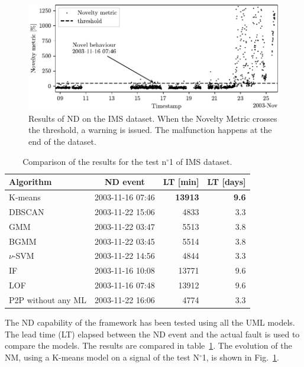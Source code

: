 \begin{figure}
    \includegraphics[width=\linewidth]{images/ND_IMS.pdf}
    \caption{Results of ND on the IMS dataset. When the Novelty Metric crosses the threshold, a warning is issued. The malfunction happens at the end of the dataset.}
    \label{fig:ND_IMS}
\end{figure}
\begin{table}
    \centering
    \caption{Comparison of the results for the test n$^\circ$1 of IMS dataset.}
    \label{tab:ims01_comparision}
    \begin{tabular}{lcrr} 
    \toprule
    \textbf{Algorithm} & \textbf{ND event} & \textbf{LT }{[}min] & \textbf{LT }{[}days] \\ 
    \hline
    K-means & 2003-11-16 07:46 & \textbf{13913} & \textbf{9.6} \\
    DBSCAN & 2003-11-22 15:06 & 4833 & 3.3\\
    GMM & 2003-11-22 03:47 & 5513 & 3.8\\
    BGMM & 2003-11-22 03:45 & 5514 & 3.8\\
    $\nu$-SVM & 2003-11-22 14:56 & 4844 &3.3\\
    IF & 2003-11-16 10:08 & 13771 & 9.6\\
    LOF & 2003-11-16 07:48 & 13912 & 9.6\\
    {P2P} without any ML & 2003-11-22 16:06 & 4774 & 3.3\\
    \bottomrule
    \end{tabular}
\end{table}
The ND capability of the framework has been tested using all the UML models. The lead time (LT) elapsed between the ND event and the actual fault is used to compare the models. The results are compared in table~\ref{tab:ims01_comparision}. The evolution of the NM, using a K-means model on a signal of the test N$^\circ$1, is shown in Fig.~\ref{fig:ND_IMS}.

